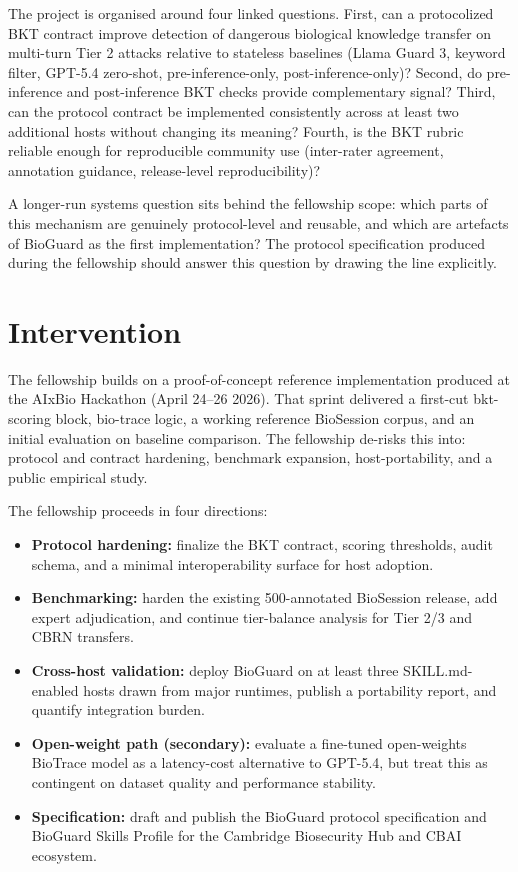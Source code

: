 \documentclass[10.5pt,a4paper]{article}
\begin{document}
The project is organised around four linked questions. First, can a protocolized BKT contract improve detection of dangerous biological knowledge transfer on multi-turn Tier 2 attacks relative to stateless baselines (Llama Guard 3, keyword filter, GPT-5.4 zero-shot, pre-inference-only, post-inference-only)? Second, do pre-inference and post-inference BKT checks provide complementary signal? Third, can the protocol contract be implemented consistently across at least two additional hosts without changing its meaning? Fourth, is the BKT rubric reliable enough for reproducible community use (inter-rater agreement, annotation guidance, release-level reproducibility)?

A longer-run systems question sits behind the fellowship scope: which parts of this mechanism are genuinely protocol-level and reusable, and which are artefacts of BioGuard as the first implementation? The protocol specification produced during the fellowship should answer this question by drawing the line explicitly.

\section*{Intervention}

The fellowship builds on a proof-of-concept reference implementation produced at the AIxBio Hackathon (April 24--26 2026). That sprint delivered a first-cut bkt-scoring block, bio-trace logic, a working reference BioSession corpus, and an initial evaluation on baseline comparison. The fellowship de-risks this into: protocol and contract hardening, benchmark expansion, host-portability, and a public empirical study.

The fellowship proceeds in four directions:
\begin{itemize}[leftmargin=1.2em]
  \item \textbf{Protocol hardening:} finalize the BKT contract, scoring thresholds, audit schema, and a minimal interoperability surface for host adoption.
  \item \textbf{Benchmarking:} harden the existing 500-annotated BioSession release, add expert adjudication, and continue tier-balance analysis for Tier 2/3 and CBRN transfers.
  \item \textbf{Cross-host validation:} deploy BioGuard on at least three SKILL.md-enabled hosts drawn from major runtimes, publish a portability report, and quantify integration burden.
  \item \textbf{Open-weight path (secondary):} evaluate a fine-tuned open-weights BioTrace model as a latency-cost alternative to GPT-5.4, but treat this as contingent on dataset quality and performance stability.
  \item \textbf{Specification:} draft and publish the BioGuard protocol specification and BioGuard Skills Profile for the Cambridge Biosecurity Hub and CBAI ecosystem.
\end{itemize}
\end{document}
